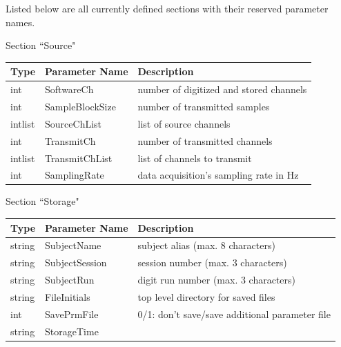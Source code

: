 \documentclass[letterpaper,oneside,12pt]{book}
\begin{document}
\begin{flushleft}
\raggedright Listed below are all currently defined sections with their reserved parameter 
names.
\\[2ex]
\raggedright \large Section ``Source" \normalsize
\\[2ex]
 \begin{tabular}{|l|l|l|}
  \hline
  \textbf{Type} & \textbf{Parameter Name} & \textbf{Description}\\
  \hline
  int & SoftwareCh & number of digitized and stored channels \\
  \hline
  int & SampleBlockSize & number of transmitted samples \\
  \hline
  intlist & SourceChList & list of source channels \\
  \hline
  int & TransmitCh & number of transmitted channels \\
  \hline
  intlist & TransmitChList & list of channels to transmit \\
  \hline
  int & SamplingRate & data acquisition's sampling rate in Hz \\
  \hline
 \end{tabular}

\vspace{.5cm}
\raggedright \large Section ``Storage" \normalsize
\\[2ex]
 \begin{tabular}{|l|l|l|}
  \hline
  \textbf{Type} & \textbf{Parameter Name} & \textbf{Description}\\
  \hline
  string & SubjectName & subject alias (max. 8 characters) \\
  \hline
  string & SubjectSession & session number (max. 3 characters) \\
  \hline
  string & SubjectRun & digit run number (max. 3 characters) \\
  \hline
  string & FileInitials & top level directory for saved files \\
  \hline
  int    & SavePrmFile & 0/1: don't save/save additional parameter file \\
  \hline
  string & StorageTime & \\
  \hline
 \end{tabular}


\end{flushleft}
\end{document}
